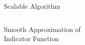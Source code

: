 \documentclass[10pt,xcolor=dvipsnames,compress]{beamer}
\begin{document}
\begin{frame}{ Scalable Algorithm}
\begin{columns}
\begin{column}{0.55\textwidth}
\footnotesize{
\hspace{0.5 in}Smooth Approximation of\\\hspace{0.5in}Indicator Function}
\end{column}
\end{columns}

\end{frame}
\end{document}
